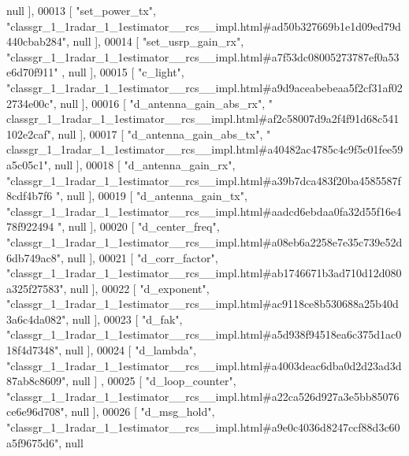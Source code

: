 \begin{DoxyCode}
      null ],
00013     [ \textcolor{stringliteral}{"set\_power\_tx"}, \textcolor{stringliteral}{"classgr\_1\_1radar\_1\_1estimator\_\_rcs\_\_impl.html#ad50b327669b1e1d09ed79d440cbab284"}, 
      null ],
00014     [ \textcolor{stringliteral}{"set\_usrp\_gain\_rx"}, \textcolor{stringliteral}{"classgr\_1\_1radar\_1\_1estimator\_\_rcs\_\_impl.html#a7f53dc08005273787ef0a53e6d70f911"}
      , null ],
00015     [ \textcolor{stringliteral}{"c\_light"}, \textcolor{stringliteral}{"classgr\_1\_1radar\_1\_1estimator\_\_rcs\_\_impl.html#a9d9aceabebeaa5f2cf31af022734e00c"}, null ],
00016     [ \textcolor{stringliteral}{"d\_antenna\_gain\_abs\_rx"}, \textcolor{stringliteral}{"
      classgr\_1\_1radar\_1\_1estimator\_\_rcs\_\_impl.html#af2c58007d9a2f4f91d68c541102e2caf"}, null ],
00017     [ \textcolor{stringliteral}{"d\_antenna\_gain\_abs\_tx"}, \textcolor{stringliteral}{"
      classgr\_1\_1radar\_1\_1estimator\_\_rcs\_\_impl.html#a40482ac4785c4c9f5c01fee59a5c05c1"}, null ],
00018     [ \textcolor{stringliteral}{"d\_antenna\_gain\_rx"}, \textcolor{stringliteral}{"classgr\_1\_1radar\_1\_1estimator\_\_rcs\_\_impl.html#a39b7dca483f20ba4585587f8cdf4b7f6
      "}, null ],
00019     [ \textcolor{stringliteral}{"d\_antenna\_gain\_tx"}, \textcolor{stringliteral}{"classgr\_1\_1radar\_1\_1estimator\_\_rcs\_\_impl.html#aadcd6ebdaa0fa32d55f16e478f922494
      "}, null ],
00020     [ \textcolor{stringliteral}{"d\_center\_freq"}, \textcolor{stringliteral}{"classgr\_1\_1radar\_1\_1estimator\_\_rcs\_\_impl.html#a08eb6a2258e7e35c739e52d6db749ac8"}, 
      null ],
00021     [ \textcolor{stringliteral}{"d\_corr\_factor"}, \textcolor{stringliteral}{"classgr\_1\_1radar\_1\_1estimator\_\_rcs\_\_impl.html#ab1746671b3ad710d12d080a325f27583"}, 
      null ],
00022     [ \textcolor{stringliteral}{"d\_exponent"}, \textcolor{stringliteral}{"classgr\_1\_1radar\_1\_1estimator\_\_rcs\_\_impl.html#ac9118ce8b530688a25b40d3a6c4da082"}, null
       ],
00023     [ \textcolor{stringliteral}{"d\_fak"}, \textcolor{stringliteral}{"classgr\_1\_1radar\_1\_1estimator\_\_rcs\_\_impl.html#a5d938f94518ea6c375d1ac018f4d7348"}, null ],
00024     [ \textcolor{stringliteral}{"d\_lambda"}, \textcolor{stringliteral}{"classgr\_1\_1radar\_1\_1estimator\_\_rcs\_\_impl.html#a4003deac6dba0d2d23ad3d87ab8c8609"}, null ]
      ,
00025     [ \textcolor{stringliteral}{"d\_loop\_counter"}, \textcolor{stringliteral}{"classgr\_1\_1radar\_1\_1estimator\_\_rcs\_\_impl.html#a22ca526d927a3e5bb85076ce6e96d708"}, 
      null ],
00026     [ \textcolor{stringliteral}{"d\_msg\_hold"}, \textcolor{stringliteral}{"classgr\_1\_1radar\_1\_1estimator\_\_rcs\_\_impl.html#a9e0c4036d8247ccf88d3c60a5f9675d6"}, null

\end{DoxyCode}
